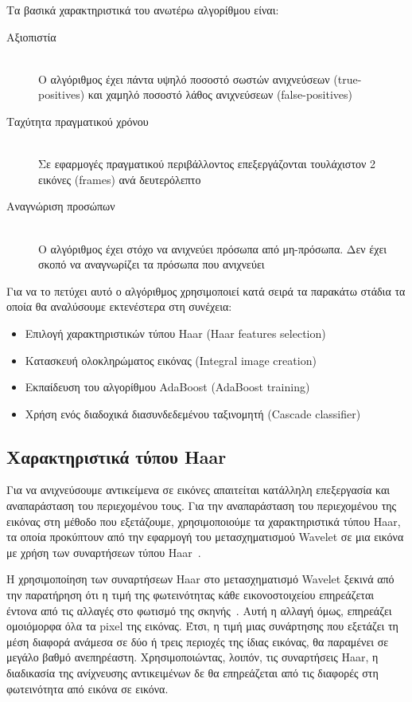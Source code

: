 Τα βασικά χαρακτηριστικά του ανωτέρω αλγορίθμου είναι:
\begin{description}
  \item[Αξιοπιστία] \hfill \\
      Ο αλγόριθμος έχει πάντα υψηλό ποσοστό σωστών ανιχνεύσεων (true-positives)
        και χαμηλό ποσοστό λάθος ανιχνεύσεων (false-positives)
  \item[Ταχύτητα πραγματικού χρόνου] \hfill \\
      Σε εφαρμογές πραγματικού περιβάλλοντος επεξεργάζονται τουλάχιστον 2 εικόνες
        (frames) ανά δευτερόλεπτο
  \item[Αναγνώριση προσώπων] \hfill \\
      Ο αλγόριθμος έχει στόχο να ανιχνεύει πρόσωπα από μη-πρόσωπα. Δεν έχει
        σκοπό να αναγνωρίζει τα πρόσωπα που ανιχνεύει
\end{description}

Για να το πετύχει αυτό ο αλγόριθμος χρησιμοποιεί κατά σειρά τα παρακάτω στάδια
τα οποία θα αναλύσουμε εκτενέστερα στη συνέχεια:
\begin{itemize}
 \item Επιλογή χαρακτηριστικών τύπου Haar (Haar features selection)
 \item Κατασκευή ολοκληρώματος εικόνας (Integral image creation)
 \item Εκπαίδευση του αλγορίθμου AdaBoost (AdaBoost training)
 \item Χρήση ενός διαδοχικά διασυνδεδεμένου ταξινομητή (Cascade classifier)
\end{itemize}

\subsection{Χαρακτηριστικά τύπου Haar}

Για να ανιχνεύσουμε αντικείμενα σε εικόνες απαιτείται κατάλληλη επεξεργασία και
αναπαράσταση του περιεχομένου τους. Για την αναπαράσταση του περιεχομένου της εικόνας στη
μέθοδο που εξετάζουμε, χρησιμοποιούμε τα χαρακτηριστικά τύπου Haar, τα οποία προκύπτουν
από την εφαρμογή του μετασχηματισμού Wavelet σε μια εικόνα με χρήση των συναρτήσεων
τύπου Haar~\cite{Viola01rapidobject}.

Η χρησιμοποίηση των συναρτήσεων Haar στο μετασχηματισμό Wavelet ξεκινά από την
παρατήρηση ότι η τιμή της φωτεινότητας κάθε εικονοστοιχείου επηρεάζεται έντονα από τις
αλλαγές στο φωτισμό της σκηνής~\cite{OrePapSinOsu97}. Αυτή η αλλαγή όμως, επηρεάζει ομοιόμορφα
όλα τα pixel της εικόνας. Έτσι, η τιμή μιας συνάρτησης που εξετάζει τη μέση διαφορά
ανάμεσα σε δύο ή τρεις περιοχές της ίδιας εικόνας, θα παραμένει σε μεγάλο βαθμό ανεπηρέαστη.
Χρησιμοποιώντας, λοιπόν, τις συναρτήσεις Haar, η διαδικασία της ανίχνευσης αντικειμένων δε θα
επηρεάζεται από τις διαφορές στη φωτεινότητα από εικόνα σε εικόνα.

